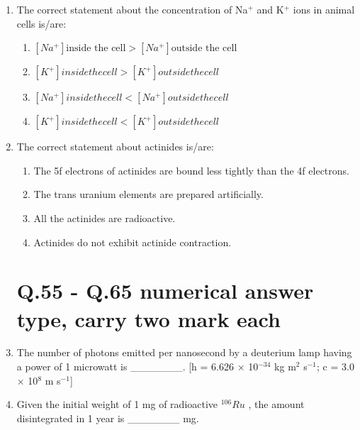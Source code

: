 \documentclass[journal,12pt,onecolumn]{IEEEtran}
\begin{document}
\begin{enumerate}
    \hfill{}

    \item The correct statement about the concentration of Na$^+$ and K$^+$ ions in animal cells is/are:
   
    \begin{enumerate}
       
 \item$[Na^+] \text{inside the cell} > [Na^+] \text{outside the cell}$
 \item$[K^+] inside the cell > [K^+] outside the cell$
 \item$[Na^+] inside the cell < [Na^+] outside the cell$
 \item$[K^+] inside the cell < [K^+] outside the cell$
    \end{enumerate}
    
    \hfill{}

    \item The correct statement about actinides is/are:
    
    \begin{enumerate}
        \item The 5f electrons of actinides are bound less tightly than the 4f electrons.
        \item The trans uranium elements are prepared artificially.
        \item All the actinides are radioactive.
        \item Actinides do not exhibit actinide contraction.
    \end{enumerate}
    
    \hfill{}
\section*{Q.55 - Q.65 numerical answer type, carry two mark each}

    \item The number of photons emitted per nanosecond by a deuterium lamp  having a power of 1 microwatt  is \_\_\_\_\_\_\_. [h = 6.626 $\times$ 10$^{-34}$ kg m$^2$ s$^{-1}$; c = 3.0 $\times$ 10$^8$ m s$^{-1}$]
    \hfill{}

    \item Given the initial weight of 1 mg of radioactive $^{106}Ru$ , the amount disintegrated in 1 year  is \_\_\_\_\_\_\_ mg.
    \hfill{}


\end{enumerate}
\end{document}
